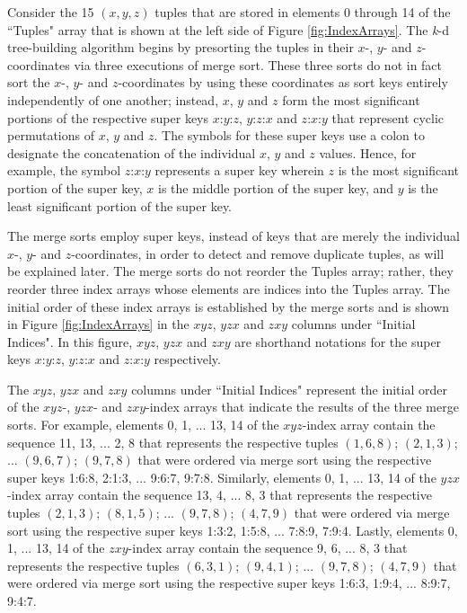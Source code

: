 \documentclass{sig-alternate}
\begin{document}
Consider the 15 $\left(x,y,z\right)$ tuples that are stored in elements 0 through 14 of the ``Tuples" array that is shown at the left side of Figure \ref{fig:IndexArrays}.  The \emph{k}-d tree-building algorithm begins by presorting the tuples in their $x$-, $y$- and $z$-coordinates via three executions of merge sort.  These three sorts do not in fact sort the $x$-, $y$- and $z$-coordinates by using these coordinates as sort keys entirely independently of one another; instead, $x$, $y$ and $z$ form the most significant portions of the respective super keys $x$:$y$:$z$, $y$:$z$:$x$ and $z$:$x$:$y$ that represent cyclic permutations of $x$, $y$ and $z$.  The symbols for these super keys use a colon to designate the concatenation of the individual $x$, $y$ and $z$ values.  Hence, for example, the symbol $z$:$x$:$y$ represents a super key wherein $z$ is the most significant portion of the super key, $x$ is the middle portion of the super key, and $y$ is the least significant portion of the super key.

The merge sorts employ super keys, instead of keys that are merely the individual $x$-, $y$- and $z$-coordinates, in order to detect and remove duplicate tuples, as will be explained later.  The merge sorts do not reorder the Tuples array; rather, they reorder three index arrays whose elements are indices into the Tuples array.  The initial order of these index arrays is established by the merge sorts and is shown in Figure \ref{fig:IndexArrays} in the $xyz$, $yzx$ and $zxy$ columns under ``Initial Indices".  In this figure, $xyz$, $yzx$ and $zxy$ are shorthand notations for the super keys $x$:$y$:$z$, $y$:$z$:$x$ and $z$:$x$:$y$ respectively. 

The $xyz$, $yzx$ and $zxy$ columns under ``Initial Indices" represent the initial order of the $xyz$-, $yzx$- and $zxy$-index arrays that indicate the results of the three merge sorts.  For example, elements 0, 1, ... 13, 14 of the $xyz$-index array contain the sequence 11, 13, ... 2, 8 that represents the respective tuples $\left(1,6,8\right)$; $\left(2,1,3\right)$; ... $\left(9,6,7\right)$; $\left(9,7,8\right)$ that were ordered via merge sort using the respective super keys 1:6:8, 2:1:3, ... 9:6:7, 9:7:8.  Similarly, elements 0, 1, ... 13, 14 of the $yzx$-index array contain the sequence 13, 4, ... 8, 3 that represents the respective tuples $\left(2,1,3\right)$; $\left(8,1,5\right)$; ... $\left(9,7,8\right)$; $\left(4,7,9\right)$ that were ordered via merge sort using the respective super keys 1:3:2, 1:5:8, ... 7:8:9, 7:9:4.  Lastly, elements 0, 1, ... 13, 14 of the $zxy$-index array contain the sequence 9, 6, ... 8, 3 that represents the respective tuples $\left(6,3,1\right)$; $\left(9,4,1\right)$; ... $\left(9,7,8\right)$; $\left(4,7,9\right)$ that were ordered via merge sort using the respective super keys 1:6:3, 1:9:4, ... 8:9:7, 9:4:7.
\end{document}
